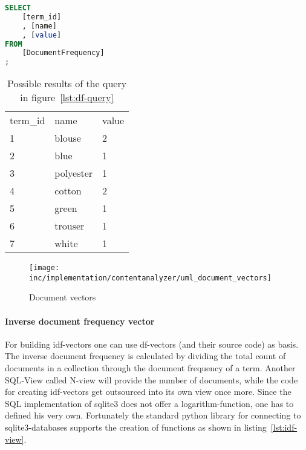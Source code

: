\begin{lstlisting}[language=SQL,caption={SQL query for generating df-vectors},label={lst:df-query},float=h]
SELECT
    [term_id]
    , [name]
    , [value]
FROM
    [DocumentFrequency]
;
\end{lstlisting}

\begin{table}
    \center
    \begin{tabular}{ l | l | l }
        \rowcolor{\dustRowHead}
        \multicolumn{3}{ c }{\textbf{df}}\\\hline
        term\_id    & name      & value\\\hline
        1           & blouse    & 2\\
        2           & blue      & 1\\
        3           & polyester & 1\\
        4           & cotton    & 2\\
        5           & green     & 1\\
        6           & trouser   & 1\\
        7           & white     & 1\\
    \end{tabular}
    \caption{Possible results of the query in figure~\ref{lst:df-query}}
    \label{tab:df-query-result}
\end{table}

\begin{figure}[h]
    \center
    \texttt{[image: inc/implementation/contentanalyzer/uml\_document\_vectors]}
    \caption{Document vectors}
    \label{fig:uml-document-vectors}
\end{figure}

\paragraph{Inverse document frequency vector}
For building idf-vectors one can use df-vectors (and their source code) as basis.
The inverse document frequency is calculated by dividing the total count of documents in a collection through the document frequency of a term.
Another SQL-View called N-view will provide the number of documents, while the code for creating idf-vectors get outsourced into its own view once more.
Since the SQL implementation of \gls{sqlite3} does not offer a logarithm-function, one has to defined his very own.
Fortunately the standard python library for connecting to sqlite3-databases supports the creation of functions as shown in listing~\ref{lst:idf-view}.


